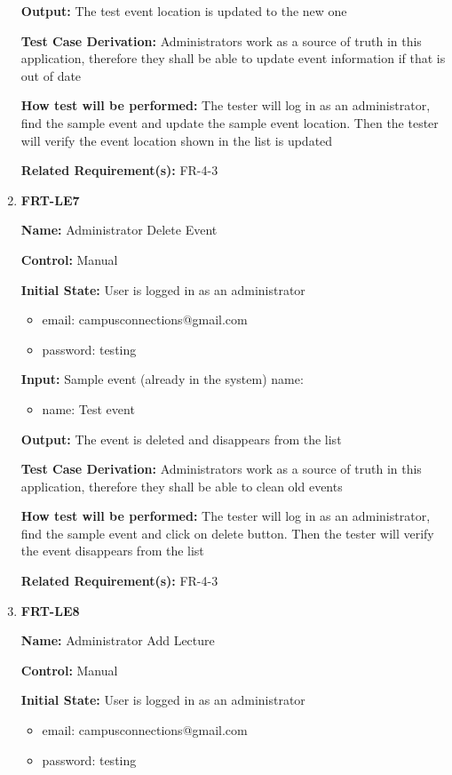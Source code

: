 \documentclass[12pt, titlepage]{article}
\begin{document}
\begin{enumerate}
\textbf{Output:} The test event location is updated to the new one

\textbf{Test Case Derivation:} Administrators work as a source of truth in this application, therefore they shall be able to update event information if that is out of date
					
\textbf{How test will be performed:} The tester will log in as an administrator, find the sample event and update the sample event location. Then the tester will verify the event location shown in the list is updated

\textbf{Related Requirement(s):} FR-4-3

\item{\textbf{FRT-LE7}}

\textbf{Name:} Administrator Delete Event

\textbf{Control:} Manual
					
\textbf{Initial State:} User is logged in as an administrator
\begin{itemize}
\item email: campusconnections@gmail.com
\item password: testing
\end{itemize}

\textbf{Input:} Sample event (already in the system) name:
\begin{itemize}
\item name: Test event
\end{itemize}
					
\textbf{Output:} The event is deleted and disappears from the list

\textbf{Test Case Derivation:} Administrators work as a source of truth in this application, therefore they shall be able to clean old events
					
\textbf{How test will be performed:} The tester will log in as an administrator, find the sample event and click on delete button. Then the tester will verify the event disappears from the list

\textbf{Related Requirement(s):} FR-4-3

\item{\textbf{FRT-LE8}}

\textbf{Name:} Administrator Add Lecture

\textbf{Control:} Manual
					
\textbf{Initial State:} User is logged in as an administrator
\begin{itemize}
\item email: campusconnections@gmail.com
\item password: testing
\end{itemize}


\end{enumerate}
\end{document}
